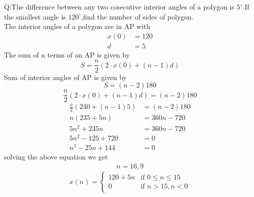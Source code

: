 \documentclass[journal,12pt,onecolumn]{IEEEtran}
\theoremstyle{remark}
\begin{document}
\let\vec\mathbf




\vspace{3cm}



\bigskip

\renewcommand{\thefigure}{\theenumi}
\renewcommand{\thetable}{\theenumi}
Q:The difference between any two cosecutive interior angles of a polygon is $5^\circ$.If the smallest angle is $120^\circ$,find the number of sides of polygon.
\\\solution
The interior angles of a polygon are in AP with
\begin{align*}
    x(0)&=120\\
    d&=5
\end{align*}
The sum of n terms of an AP is given by
\begin{equation}
    S=\frac{n}{2}(2\cdot x(0)+(n-1)d)
\end{equation}
Sum of interior angles of AP is given by
\begin{equation}
    S=(n-2)180
\end{equation}
\[\frac{n}{2}(2\cdot x(0)+(n-1)d)= (n-2)180 \]
\[
\begin{aligned}
    \frac{n}{2}(240+(n-1)5)&=(n-2)180\\
    n(235+5n)&=360n-720\\
    5n^2+235n&=360n-720\\
    5n^2-125+720&=0\\
    n^2-25n+144&=0
\end{aligned}
\]
solving the above equation we get
\[
\begin{aligned}
   n=16,9
\end{aligned}
\]
\[ x(n) = \begin{cases}
          120 + 5n & \text{if }0 \leq n\leq 15 \\
          0 & \text{if } n >15 , n<0
       \end{cases} \]
\end{document}
